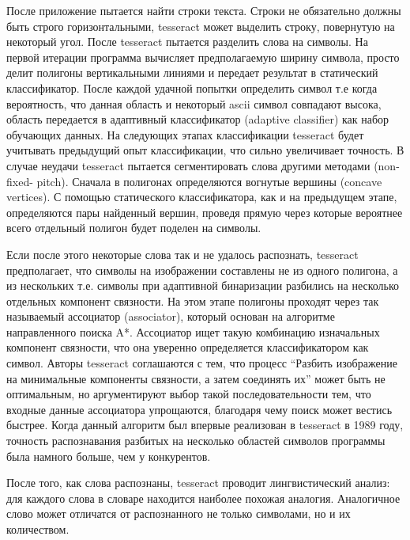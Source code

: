 \documentclass[oneside,final,14pt]{extreport}
\begin{document}
После приложение пытается найти строки текста. Строки не обязательно должны быть строго горизонтальными, tesseract может выделить строку, повернутую на некоторый угол. После tesseract пытается разделить слова на символы. На первой итерации программа вычисляет предполагаемую ширину символа, просто делит полигоны вертикальными линиями и передает результат в статический классификатор. После каждой удачной попытки определить символ т.е когда вероятность, что данная область и некоторый ascii символ совпадают высока, область передается в адаптивный классификатор (adaptive classifier)  как набор обучающих данных. На следующих этапах классификации tesseract будет учитывать предыдущий опыт классификации, что сильно увеличивает точность.  В случае неудачи tesseract пытается сегментировать слова другими методами (non-fixed-
pitch). Сначала в полигонах определяются вогнутые вершины (concave  vertices). С помощью статического классификатора, как и на предыдущем этапе, определяются пары найденный вершин, проведя прямую через которые вероятнее всего отдельный полигон будет поделен на символы. 


Если после этого некоторые слова так и не удалось распознать, tesseract предполагает, что символы на изображении составлены не из одного полигона, а из нескольких т.е. символы при адаптивной бинаризации разбились на несколько отдельных компонент связности. На этом этапе полигоны проходят через так называемый ассоциатор (associator), который основан на алгоритме направленного поиска A*. Ассоциатор ищет такую комбинацию изначальных компонент связности, что она уверенно определяется классификатором как символ. Авторы tesseract соглашаются с тем, что процесс “Разбить изображение на минимальные компоненты связности, а затем соединять их” может быть не оптимальным, но аргументируют выбор такой последовательности тем, что входные данные ассоциатора упрощаются, благодаря чему поиск может вестись быстрее. Когда данный алгоритм был впервые реализован в tesseract в 1989 году, точность распознавания разбитых на несколько областей символов программы была намного больше, чем у конкурентов.

После того, как слова распознаны, tesseract проводит лингвистический анализ: для каждого слова в словаре находится наиболее похожая аналогия. Аналогичное слово может отличатся от распознанного не только символами, но и их количеством.
\end{document}
